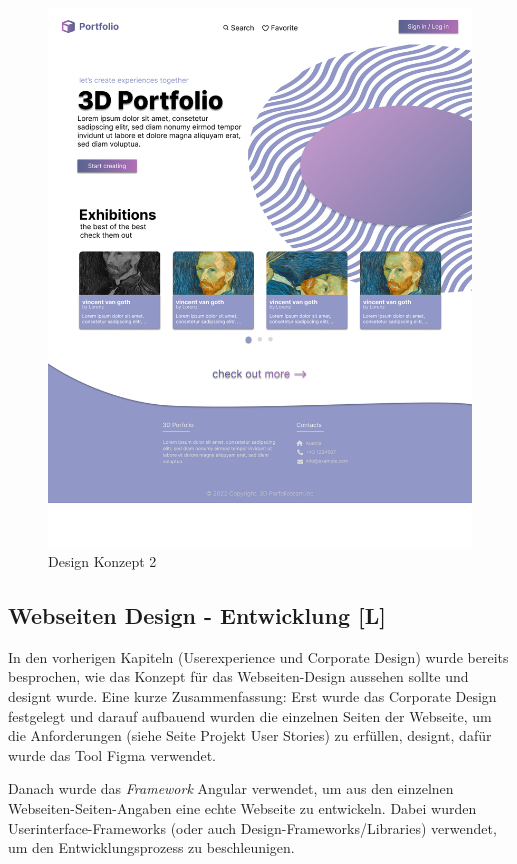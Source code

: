 \begin{figure}
    \centering
    \includegraphics[scale=0.3]{pics/DesignKonzept2.png}
    \caption{Design Konzept 2}
\end{figure}

\subsection{Webseiten Design - Entwicklung [L]}
In den vorherigen Kapiteln (Userexperience und Corporate Design) wurde bereits besprochen, wie das Konzept für das Webseiten-Design aussehen sollte und designt wurde. Eine kurze Zusammenfassung: Erst wurde das Corporate Design festgelegt und darauf aufbauend wurden die einzelnen Seiten der Webseite, um die Anforderungen (siehe Seite \pageref{ch:umsetzung:projekt-user-stories} Projekt User Stories) zu erfüllen, designt, dafür wurde das Tool Figma verwendet.

Danach wurde das \emph{Framework} Angular verwendet, um aus den einzelnen Webseiten-Seiten-Angaben eine echte Webseite zu entwickeln. Dabei wurden Userinterface-Frameworks (oder auch Design-Frameworks/Libraries) verwendet, um den Entwicklungsprozess zu beschleunigen.

